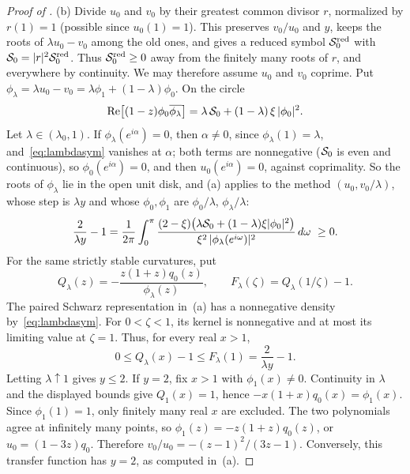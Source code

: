 \documentclass[11pt]{article}
\theoremstyle{definition}
\theoremstyle{remark}
\newcommand{\Rea}{\operatorname{Re}}
\begin{document}
\begin{proof}[Proof of ]
(b) Divide \(u_0\) and \(v_0\) by their greatest common divisor \(r\), normalized by \(r(1)=1\) (possible since \(u_0(1)=1\)).
This preserves \(v_0/u_0\) and \(y\), keeps the roots of \(\lambda u_0-v_0\) among the old ones, and gives a reduced symbol
\(\mathcal S_0^{\rm red}\) with \(\mathcal S_0=|r|^2\mathcal S_0^{\rm red}\).  Thus \(\mathcal S_0^{\rm red}\ge0\) away from the finitely many roots of \(r\),
and everywhere by continuity.  We may therefore assume \(u_0\) and \(v_0\) coprime.  Put \(\phi_\lambda=\lambda u_0-v_0=\lambda\phi_1+(1-\lambda)\phi_0\).  On the circle
\begin{equation}\label{eq:lambdasym}
\Rea\bigl[(1-z)\phi_0\overline{\phi_\lambda}\bigr]=\lambda\,\Szero+(1-\lambda)\,\xi\,|\phi_0|^2 .
\end{equation}
Let \(\lambda\in(\lambda_0,1)\).  If \(\phi_\lambda(e^{i\alpha})=0\), then \(\alpha\ne0\), since \(\phi_\lambda(1)=\lambda\), and~\eqref{eq:lambdasym} vanishes at \(\alpha\); both terms
are nonnegative (\(\mathcal S_0\) is even and continuous), so \(\phi_0(e^{i\alpha})=0\), and then \(u_0(e^{i\alpha})=0\), against coprimality.
So the roots of \(\phi_\lambda\) lie in the open unit disk, and (a) applies to the method \((u_0,v_0/\lambda)\), whose step is \(\lambda y\)
and whose \(\phi_0,\phi_1\) are \(\phi_0/\lambda\), \(\phi_\lambda/\lambda\):
\begin{equation}\label{eq:tracelambda}
\frac2{\lambda y}-1=\frac1{2\pi}\int_0^\pi\frac{(2-\xi)\bigl(\lambda\Szero+(1-\lambda)\xi|\phi_0|^2\bigr)}{\xi^2\,|\phi_\lambda(e^{i\omega})|^2}\,d\omega\ \ge0 .
\end{equation}
For the same strictly stable curvatures, put
\[
Q_\lambda(z)=-\frac{z(1+z)q_0(z)}{\phi_\lambda(z)},\qquad F_\lambda(\zeta)=Q_\lambda(1/\zeta)-1.
\]
The paired Schwarz representation in~(a) has a nonnegative density by~\eqref{eq:lambdasym}.
For \(0<\zeta<1\), its kernel is nonnegative and at most its limiting value at \(\zeta=1\).
Thus, for every real \(x>1\),
\[
0\le Q_\lambda(x)-1\le F_\lambda(1)=\frac2{\lambda y}-1.
\]
Letting \(\lambda\uparrow1\) gives \(y\le2\).  If \(y=2\), fix \(x>1\) with \(\phi_1(x)\ne0\).
Continuity in \(\lambda\) and the displayed bounds give \(Q_1(x)=1\), hence
\(-x(1+x)q_0(x)=\phi_1(x)\).  Since \(\phi_1(1)=1\), only finitely many real \(x\) are excluded.
The two polynomials agree at infinitely many points, so
\(\phi_1(z)=-z(1+z)q_0(z)\), or \(u_0=(1-3z)q_0\).
Therefore \(v_0/u_0=-(z-1)^2/(3z-1)\).  Conversely, this transfer function has \(y=2\), as computed in~(a).
\end{proof}
\end{document}
